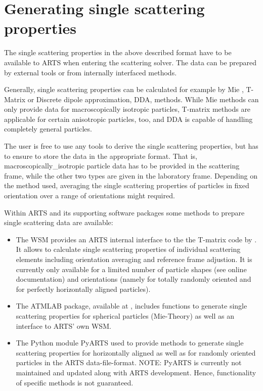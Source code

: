 \section{Generating single scattering properties}
\label{sec:clouds:ssdgen}

The single scattering properties in the above described format have to be
available to ARTS when entering the scattering solver. The data can be
prepared by external tools or from internally interfaced methods.

Generally, single scattering properties can be calculated for example by Mie
\citep[e.g.][]{wiscombe80:_improved_ao, maetzler02:_matlab}, T-Matrix
\citep{Mishchenko:98} or Discrete dipole approximation, DDA,
\citep[e.g][]{yurkin11:_adda_jqsrt} methods. While Mie methods can only provide
data for macroscopically isotropic particles, T-matrix methods are applicable
for certain anisotropic particles, too, and DDA is capable of handling
completely general particles.

The user is free to use any tools to derive the single scattering
properties, but has to ensure to store the data in the appropriate format. That
is, macroscopically\_isotropic particle data has to be provided in the
scattering frame, while the other two types are given in the laboratory frame.
Depending on the method used, averaging the single scattering properties of
particles in fixed orientation over a range of orientations might required.

Within ARTS and its supporting software packages some methods to prepare single
scattering data are available:
\begin{itemize}
\item
The WSM  provides an ARTS internal interface
to the the T-matrix code by \citet{Mishchenko:02}. It allows to calculate single
scattering properties of individual scattering elements including orientation
averaging and reference frame adjustion. It is currently only available for a
limited number of particle shapes (see online documentation) and orientations
(namely for totally randomly oriented and for perfectly horizontally aligned
particles).
\item
The ATMLAB package, available at , includes functions to
generate single scattering properties for spherical particles (Mie-Theory) as
well as an interface to ARTS' own  WSM.
\item
The Python module PyARTS used to provide methods to generate single scattering
properties for horizontally aligned as well as for randomly oriented particles
in the ARTS data-file-format. NOTE: PyARTS is currently not maintained and
updated along with ARTS development. Hence, functionality of specific methods is
not guaranteed.
\end{itemize}

